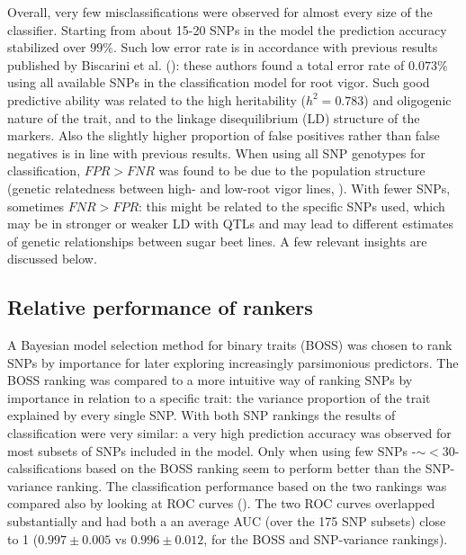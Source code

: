 Overall, very few misclassifications were observed for almost every size
of the classifier. Starting from about 15-20 SNPs in the model the prediction
accuracy stabilized over $99\%$. Such low error rate is in accordance
with previous results published by Biscarini et al.
(\cite{biscarini2014genome}): these authors found a total error rate of
$0.073\%$ using all available SNPs in the classification model for root vigor. Such
good predictive ability was related to the high heritability ($h^2=0.783$)
and oligogenic nature of the trait, and to the linkage disequilibrium
(LD) structure of the markers. Also the slightly higher proportion of
false positives rather than false negatives is in line with previous
results. When using all SNP genotypes for classification, $FPR>FNR$ was
found to be due to the population structure (genetic relatedness between
high- and low-root vigor lines, \cite{biscarini2014genome}). With fewer
SNPs, sometimes $FNR>FPR$: this might be related to the specific SNPs
used, which may be in stronger or weaker LD with QTLs and may lead to
different estimates of genetic relationships between sugar beet lines. 
A few relevant insights are discussed below.


\subsection{Relative performance of rankers}
A Bayesian model selection method for binary traits (BOSS) was chosen to
rank SNPs by importance for later exploring increasingly parsimonious
predictors. The BOSS ranking was compared to a more intuitive way of
ranking SNPs by importance in relation to a specific trait: the variance
proportion of the trait explained by every single SNP.
With both SNP rankings the results of classification were very similar:
a very high prediction accuracy was observed for most subsets of SNPs
included in the model. Only when using few SNPs -$\sim < 30$-
calssifications based on the BOSS ranking seem to perform better than
the SNP-variance ranking.
The classification performance based on the two rankings was compared
also by looking at ROC curves (\cite{fawcett2004roc}). The two ROC
curves overlapped substantially and had both a an average AUC (over the
175 SNP subsets) close to 1 ($0.997 \pm 0.005$ vs $0.996 \pm 0.012$, for
the BOSS and SNP-variance rankings).

